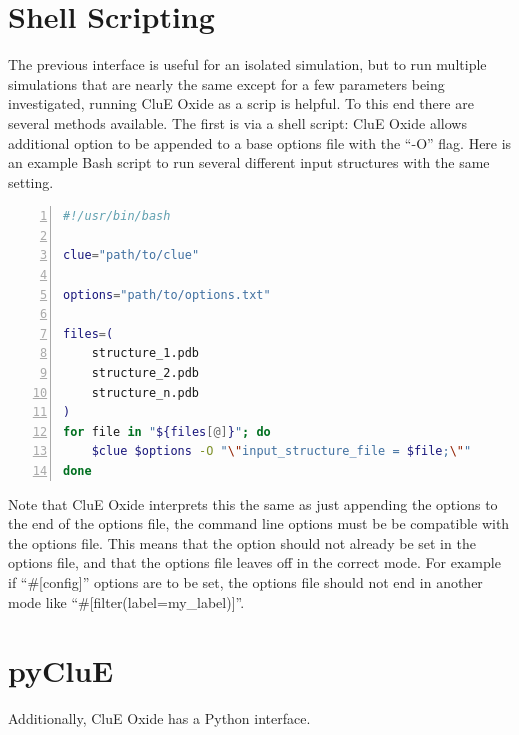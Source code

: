 \documentclass{book}
\begin{document}
\section{Shell Scripting}
The previous interface is useful for an isolated simulation, 
but to run multiple simulations that are nearly the same except for a few
parameters being investigated, running CluE Oxide as a scrip is helpful.  
To this end there are several methods available.
The first is via a shell script: CluE Oxide allows additional option to be appended
to a base options file with the ``-O'' flag.  
Here is an example  Bash script to run several different input structures
with the same setting.
\begin{lstlisting}[frame=single,numbers=left,language=bash]
#!/usr/bin/bash

clue="path/to/clue"

options="path/to/options.txt"

files=( 
    structure_1.pdb
    structure_2.pdb
    structure_n.pdb
)
for file in "${files[@]}"; do
    $clue $options -O "\"input_structure_file = $file;\""
done
\end{lstlisting}
Note that CluE Oxide interprets this the same as just appending 
the options to the end of the options file,
the command line options must be be compatible with the options file.
This means that the option should not already be set in the options file,
and that the options file leaves off in the correct mode.
For example if ``\#[config]'' options are to be set, the options file should
not end in another mode like ``\#[filter(label=my\_label)]''.

\section{pyCluE}
Additionally, CluE Oxide has a Python interface.
\end{document}
